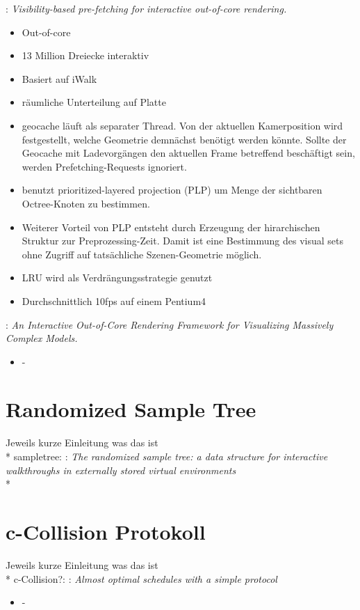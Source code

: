 \cite{wagner2}: \textit{Visibility-based pre-fetching for interactive out-of-core rendering.}
\begin{itemize}
 \item Out-of-core
 \item 13 Million Dreiecke interaktiv
 \item Basiert auf iWalk
 \item räumliche Unterteilung auf Platte
 \item geocache läuft als separater Thread. Von der aktuellen Kamerposition wird festgestellt, welche Geometrie demnächst benötigt werden könnte. Sollte der Geocache mit Ladevorgängen den aktuellen Frame betreffend beschäftigt sein, werden Prefetching-Requests ignoriert.
 \item benutzt prioritized-layered projection (PLP) um Menge der sichtbaren Octree-Knoten zu bestimmen.
 \item Weiterer Vorteil von PLP entsteht durch Erzeugung der hirarchischen Struktur zur Preprozessing-Zeit. Damit ist eine Bestimmung des visual sets ohne Zugriff auf tatsächliche Szenen-Geometrie möglich.
 \item LRU wird als Verdrängungsstrategie genutzt
 \item Durchschnittlich 10fps auf einem Pentium4
\end{itemize}

\cite{wald}: \textit{An Interactive Out-of-Core Rendering Framework for Visualizing Massively Complex Models.}
\begin{itemize}
 \item -
\end{itemize}

\section{Randomized Sample Tree}
Jeweils kurze Einleitung was das ist\\*
sampletree: \cite{klein}: \textit{The randomized sample tree: a data structure for interactive walkthroughs in externally stored virtual environments}\\*

\section{c-Collision Protokoll}
Jeweils kurze Einleitung was das ist\\*
c-Collision?: \cite{DBLP:conf/arcs/RehbergS99}: \textit{Almost optimal schedules with a simple protocol}
\begin{itemize}
 \item -
\end{itemize}


